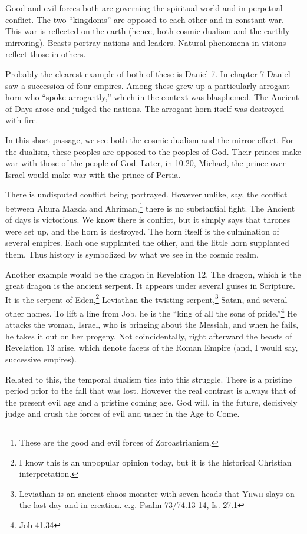 \documentclass{article}
\begin{document}
Good and evil forces both are governing the spiritual world and in perpetual conflict.
The two ``kingdoms'' are opposed to each other and in constant war.
This war is reflected on the earth (hence, both cosmic dualism and the earthly mirroring).
Beasts portray nations and leaders.
Natural phenomena in visions reflect those in others.

Probably the clearest example of both of these is Daniel 7.
In chapter 7 Daniel saw a succession of four empires.
Among these grew up a particularly arrogant horn who ``spoke arrogantly,'' which in the context was blasphemed.
The Ancient of Days arose and judged the nations.
The arrogant horn itself was destroyed with fire.

In this short passage, we see both the cosmic dualism and the mirror effect.
For the dualism, these peoples are opposed to the peoples of God.
Their princes make war with those of the people of God.
Later, in 10.20, Michael, the prince over Israel would make war with the prince of Persia.

There is undisputed conflict being portrayed.
However unlike, say, the conflict between Ahura Mazda and Ahriman,\footnote{
	These are the good and evil forces of Zoroastrianism.
}
there is no substantial fight.
The Ancient of days is victorious.
We know there is conflict, but it simply says that thrones were set up, and the horn is destroyed.
The horn itself is the culmination of several empires.
Each one supplanted the other, and the little horn supplanted them.
Thus history is symbolized by what we see in the cosmic realm.

Another example would be the dragon in Revelation 12.
The dragon, which is the great dragon is the ancient serpent.
It appears under several guises in Scripture.
It is the serpent of Eden,\footnote{
	I know this is an unpopular opinion today, but it is the historical Christian interpretation.
}
Leviathan the twisting serpent,\footnote{
  Leviathan is an ancient chaos monster with seven heads that \textsc{Yhwh} slays on the last day and in creation. e.g. Psalm 73/74.13-14, Is. 27.1
}
Satan, and several other names.
To lift a line from Job, he is the ``king of all the sons of pride.''\footnote{Job 41.34}
He attacks the woman, Israel, who is bringing about the Messiah, and when he fails, he takes it out on her progeny.
Not coincidentally, right afterward the beasts of Revelation 13 arise, which denote facets of the Roman Empire (and, I would say, successive empires).

Related to this, the temporal dualism ties into this struggle.
There is a pristine period prior to the fall that was lost.
However the real contrast is always that of the present evil age and a pristine coming age.
God will, in the future, decisively judge and crush the forces of evil and usher in the Age to Come.
\end{document}
